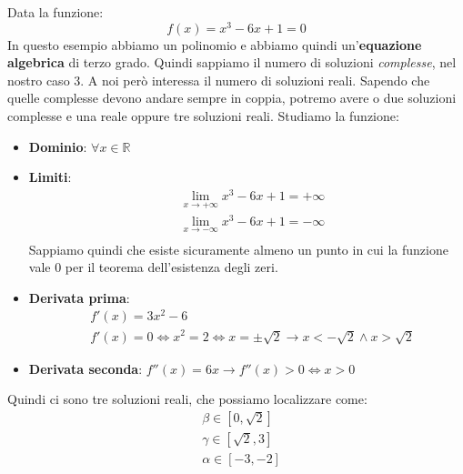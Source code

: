 \begin{example}
	Data la funzione:
	\begin{equation}
		f(x)= x^3 -6x +1 = 0
	\end{equation}
	In questo esempio abbiamo un polinomio e abbiamo quindi un'\textbf{equazione algebrica} di terzo grado. Quindi sappiamo il numero di soluzioni \textit{complesse}, nel nostro caso $3$. A noi però interessa il numero di soluzioni reali. Sapendo che quelle complesse devono andare sempre in coppia, potremo avere o due soluzioni complesse e una reale oppure tre soluzioni reali. Studiamo la funzione:
	\begin{itemize}
		\item \textbf{Dominio}: $\forall x \in \mathbb{R}$
		\item \textbf{Limiti}:
		\begin{align*}
			& \lim_{x \to + \infty} x^3 -6x +1 = + \infty\\
			& \lim_{x \to - \infty} x^3 -6x +1 = - \infty\\
		\end{align*}
		Sappiamo quindi che esiste sicuramente almeno un punto in cui la funzione vale $0$ per il teorema dell'esistenza degli zeri.
		\item \textbf{Derivata prima}: \begin{align*}
			& f'(x) = 3x^2-6 \\
			& f'(x) = 0 \Leftrightarrow x^2 = 2 \Leftrightarrow x = \pm \sqrt{2} \to x < -\sqrt{2} \land x > \sqrt{2}
		\end{align*}
		\item \textbf{Derivata seconda}: $f''(x)=6x \to f''(x) > 0 \Leftrightarrow x>0$
	\end{itemize}
	\begin{center}
	\end{center}
	Quindi ci sono tre soluzioni reali, che possiamo localizzare come:
	\begin{align*}
		& \beta \in [0, \sqrt{2}]\\
		& \gamma \in [\sqrt{2}, 3]\\
		& \alpha \in [-3,-2]
	\end{align*}
\end{example}
